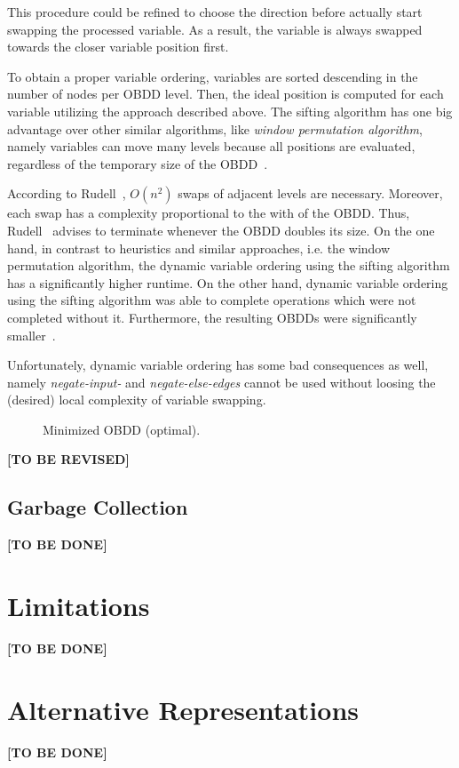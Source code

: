 \documentclass{vldb}
\newcommand{\tbr}{\textbf{[TO BE REVISED]}}
\newcommand{\tbd}{\textbf{[TO BE DONE]}}
\begin{document}
This procedure could be refined to choose the direction before actually start
swapping the processed variable. As a result, the variable is always swapped
towards the closer variable position first.

To obtain a proper variable ordering, variables are sorted descending in the number
of nodes per OBDD level. Then, the ideal position is computed for each variable
utilizing the approach described above. The sifting algorithm has one big advantage
over other similar algorithms, like \textit{window permutation algorithm}, namely
variables can move many levels because all positions are evaluated, regardless of
the temporary size of the OBDD~\cite{RUDELL93}.

According to Rudell~\cite{RUDELL93}, $O(n^2)$ swaps of adjacent levels are
necessary. Moreover, each swap has a complexity proportional to the with of the
OBDD. Thus, Rudell~\cite{RUDELL93} advises to terminate whenever the OBDD doubles
its size. On the one hand, in contrast to heuristics and similar approaches, i.e.
the window permutation algorithm, the dynamic variable ordering using the sifting
algorithm has a significantly higher runtime. On the other hand, dynamic variable
ordering using the sifting algorithm was able to complete operations which were
not completed without it. Furthermore, the resulting OBDDs were significantly
smaller~\cite{RUDELL93}.

Unfortunately, dynamic variable ordering has some bad consequences as well, namely
\textit{negate-input-} and \textit{negate-else-edges} cannot be used without
loosing the (desired) local complexity of variable swapping.

\begin{figure}[ht]
    \centering
    
    \caption{Minimized OBDD (optimal).}
    \label{fig:min-obdd}
\end{figure}
\tbr

\subsection{Garbage Collection}
\label{subsec:garbage-collection}

\tbd

\section{Limitations}
\label{sec:limitations}

\tbd

\section{Alternative Representations}
\label{sec:alternative-representations}

\tbd

\balance



\end{document}
